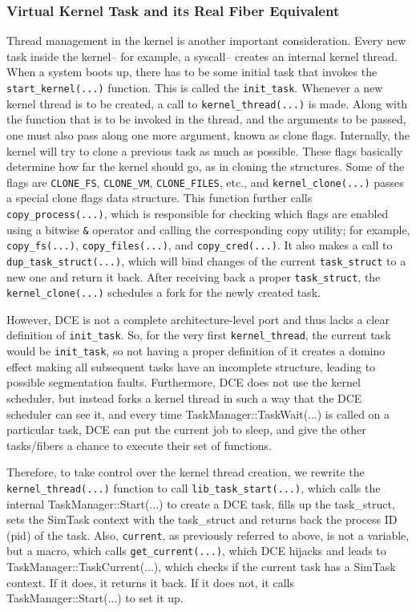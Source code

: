 \documentclass{sig-alternate}
\begin{document}
\subsubsection{Virtual Kernel Task and its Real Fiber Equivalent}
Thread management in the kernel is another important consideration.
Every new task inside the kernel-- for example, a syscall-- 
creates an internal kernel thread.  When a system boots up, there has to be some initial task that invokes the \texttt{start\_kernel(...)} 
function. This is called the \texttt{init\_task}. Whenever a new kernel thread is to be created, a call to \texttt{kernel\_thread(...)} is made. Along with the 
function that is to be invoked in the thread, and the arguments to be passed, one must also pass along one more argument, known as clone flags. 
Internally, the kernel will try to clone a previous task as much as possible. These flags basically determine 
how far the kernel should go, as in cloning the structures. Some of the flags are \texttt{CLONE\_FS}, \texttt{CLONE\_VM}, \texttt{CLONE\_FILES}, etc., and \texttt{kernel\_clone(...)} 
passes a special clone flags data structure. This function further calls \texttt{copy\_process(...)}, which is responsible for checking which 
flags are enabled using a bitwise \texttt{\&} operator and calling the corresponding copy utility; for example, \texttt{copy\_fs(...)}, \texttt{copy\_files(...)}, and \texttt{copy\_cred(...)}.
It also makes a call to \texttt{dup\_task\_struct(...)}, which will bind changes of the current \texttt{task\_struct} to a new one and return it back. After 
receiving
back a proper \texttt{task\_struct}, the \texttt{kernel\_clone(...)} schedules a fork for the newly created task.

However, DCE is not a complete architecture-level port and thus lacks a 
clear definition of \texttt{init\_task}. So, for the very first \texttt{kernel\_thread}, the current task would be \texttt{init\_task}, so not having a proper definition of it creates a domino effect making all subsequent tasks have an incomplete structure, leading to possible segmentation faults.  Furthermore, DCE does not use 
the kernel scheduler, but instead forks a kernel thread in such a way that the DCE scheduler can see it, and every time 
TaskManager::TaskWait(...)  is called on a particular task, DCE can put the current job to sleep, and give the other tasks/fibers a chance to 
execute their set of functions. 

Therefore, to take  control over the kernel thread creation, we rewrite the \texttt{kernel\_thread(...)} function to call 
\texttt{lib\_task\_start(...)}, which calls the 
internal TaskManager::Start(...) to create a DCE task, fills up the task\_struct, sets the SimTask context with the task\_struct and returns back 
the process ID (pid) of the task. Also, \texttt{current}, as previously referred to above, is not a variable, but a macro, which calls \texttt{get\_current(...)}, which DCE hijacks and leads to TaskManager::TaskCurrent(...), which checks if the current task has a SimTask context. If it does, it returns it back. 
If it does not, it calls TaskManager::Start(...) to set it up.
 
\end{document}
